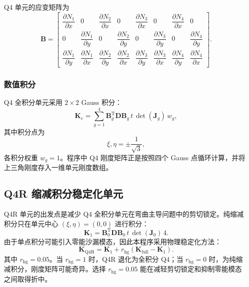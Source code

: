 \documentclass[UTF8,a4paper,zihao=-4]{ctexart}
\newcommand{\T}{\mathrm{T}}
\newcommand{\Dmat}{\bm{D}}
\newcommand{\Bmat}{\bm{B}}
\newcommand{\Kmat}{\bm{K}}
\begin{document}
Q4 单元的应变矩阵为
\begin{equation}
    \Bmat =
    \begin{bmatrix}
        \dfrac{\partial N_1}{\partial x} & 0 &
        \dfrac{\partial N_2}{\partial x} & 0 &
        \dfrac{\partial N_3}{\partial x} & 0 &
        \dfrac{\partial N_4}{\partial x} & 0\\[0.8em]
        0 & \dfrac{\partial N_1}{\partial y} &
        0 & \dfrac{\partial N_2}{\partial y} &
        0 & \dfrac{\partial N_3}{\partial y} &
        0 & \dfrac{\partial N_4}{\partial y}\\[0.8em]
        \dfrac{\partial N_1}{\partial y} &
        \dfrac{\partial N_1}{\partial x} &
        \dfrac{\partial N_2}{\partial y} &
        \dfrac{\partial N_2}{\partial x} &
        \dfrac{\partial N_3}{\partial y} &
        \dfrac{\partial N_3}{\partial x} &
        \dfrac{\partial N_4}{\partial y} &
        \dfrac{\partial N_4}{\partial x}
    \end{bmatrix}.
\end{equation}

\subsubsection{数值积分}

Q4 全积分单元采用 $2\times2$ Gauss 积分：
\begin{equation}
    \Kmat_e
    =
    \sum_{g=1}^{4}
    \Bmat_g^{\T}\Dmat\Bmat_g\,
    t\,\det(\bm{J}_g)\,w_g ,
\end{equation}
其中积分点为
\begin{equation}
    \xi,\eta = \pm \frac{1}{\sqrt{3}},
\end{equation}
各积分权重 $w_g=1$。程序中 Q4 刚度矩阵正是按照四个 Gauss 点循环计算，并将上三角刚度存入一维单元刚度数组。

\subsection{Q4R 缩减积分稳定化单元}

Q4R 单元的出发点是减少 Q4 全积分单元在弯曲主导问题中的剪切锁定。纯缩减积分只在单元中心 $(\xi,\eta)=(0,0)$ 进行积分：
\begin{equation}
    \Kmat_{1}
    =
    \Bmat_{0}^{\T}\Dmat\Bmat_{0}\,
    t\,\det(\bm{J}_{0})\,4 .
\end{equation}
由于单点积分可能引入零能沙漏模态，因此本程序采用物理稳定化方法：
\begin{equation}
    \Kmat_{\mathrm{Q4R}}
    =
    \Kmat_{1}
    +
    r_{\mathrm{hg}}
    \left(
        \Kmat_{\mathrm{full}}-\Kmat_{1}
    \right).
\end{equation}
其中 $r_{\mathrm{hg}}=0.05$。当 $r_{\mathrm{hg}}=1$ 时，Q4R 退化为全积分 Q4；当 $r_{\mathrm{hg}}=0$ 时，为纯缩减积分，刚度矩阵可能奇异。选择 $r_{\mathrm{hg}}=0.05$ 能在减轻剪切锁定和抑制零能模态之间取得折中。
\end{document}
